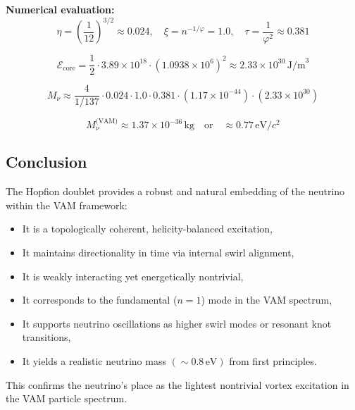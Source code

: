 \noindent
\textbf{Numerical evaluation:}
\[
\eta = \left( \frac{1}{12} \right)^{3/2} \approx 0.024, \quad
\xi = n^{-1/\varphi} = 1.0, \quad
\tau = \frac{1}{\varphi^2} \approx 0.381
\]

\[
\mathcal{E}_\text{core} = \frac{1}{2} \cdot 3.89 \times 10^{18} \cdot (1.0938 \times 10^6)^2 \approx 2.33 \times 10^{30} \, \text{J/m}^3
\]

\[
M_\nu \approx \frac{4}{1/137} \cdot 0.024 \cdot 1.0 \cdot 0.381 \cdot (1.17 \times 10^{-44}) \cdot (2.33 \times 10^{30})
\]

\[
\boxed{
M_\nu^\text{(VAM)} \approx 1.37 \times 10^{-36} \, \text{kg}
}
\quad \text{or} \quad
\boxed{
\approx 0.77 \, \text{eV}/c^2
}
\]

\subsection{Conclusion}

The Hopfion doublet provides a robust and natural embedding of the neutrino within the VAM framework:

\begin{itemize}
    \item It is a topologically coherent, helicity-balanced excitation,
    \item It maintains directionality in time via internal swirl alignment,
    \item It is weakly interacting yet energetically nontrivial,
    \item It corresponds to the fundamental (\(n = 1\)) mode in the VAM spectrum,
    \item It supports neutrino oscillations as higher swirl modes or resonant knot transitions,
    \item It yields a realistic neutrino mass \((\sim 0.8 \, \text{eV})\) from first principles.
\end{itemize}

This confirms the neutrino’s place as the lightest nontrivial vortex excitation in the VAM particle spectrum.
